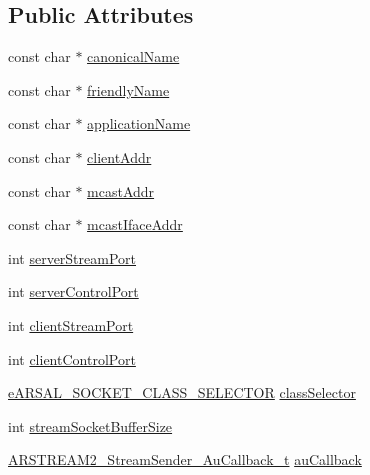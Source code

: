 \subsection*{Public Attributes}
\begin{DoxyCompactItemize}
\item 
const char $\ast$ \hyperlink{struct_a_r_s_t_r_e_a_m2___stream_sender___config__t_aa8bd89e7495f77d398dc65dd14c5d0fb}{canonical\+Name}
\item 
const char $\ast$ \hyperlink{struct_a_r_s_t_r_e_a_m2___stream_sender___config__t_af54158ca53377bfeee0cf26bdecea2a6}{friendly\+Name}
\item 
const char $\ast$ \hyperlink{struct_a_r_s_t_r_e_a_m2___stream_sender___config__t_a15da681a26d0f6ea932bf229898ac09f}{application\+Name}
\item 
const char $\ast$ \hyperlink{struct_a_r_s_t_r_e_a_m2___stream_sender___config__t_aed559fd35ae3729f0a183dea80ff820c}{client\+Addr}
\item 
const char $\ast$ \hyperlink{struct_a_r_s_t_r_e_a_m2___stream_sender___config__t_a0b083fe1ca17180653ff630ca6abb855}{mcast\+Addr}
\item 
const char $\ast$ \hyperlink{struct_a_r_s_t_r_e_a_m2___stream_sender___config__t_a2eb83e96566d124de30445c0d151f4d1}{mcast\+Iface\+Addr}
\item 
int \hyperlink{struct_a_r_s_t_r_e_a_m2___stream_sender___config__t_a33d9c51dd66d6f97de55684e27a23adc}{server\+Stream\+Port}
\item 
int \hyperlink{struct_a_r_s_t_r_e_a_m2___stream_sender___config__t_aa0792f0abdf2ea6b6fbf08d68d550a1e}{server\+Control\+Port}
\item 
int \hyperlink{struct_a_r_s_t_r_e_a_m2___stream_sender___config__t_a50fe4956833d82e763efe0fc8c44c344}{client\+Stream\+Port}
\item 
int \hyperlink{struct_a_r_s_t_r_e_a_m2___stream_sender___config__t_a804bf81f815b2d6d35abcda939afd4ab}{client\+Control\+Port}
\item 
\hyperlink{_a_r_s_a_l___socket_8h_a384a22e08e042073bccebf450786749b}{e\+A\+R\+S\+A\+L\+\_\+\+S\+O\+C\+K\+E\+T\+\_\+\+C\+L\+A\+S\+S\+\_\+\+S\+E\+L\+E\+C\+T\+OR} \hyperlink{struct_a_r_s_t_r_e_a_m2___stream_sender___config__t_a9420055cf4a97f65869ae9079c6cd918}{class\+Selector}
\item 
int \hyperlink{struct_a_r_s_t_r_e_a_m2___stream_sender___config__t_acba680e506f27b47148fe9d498efa88c}{stream\+Socket\+Buffer\+Size}
\item 
\hyperlink{arstream2__stream__sender_8h_a5d1862b0b8e1a4fa199887582cf04809}{A\+R\+S\+T\+R\+E\+A\+M2\+\_\+\+Stream\+Sender\+\_\+\+Au\+Callback\+\_\+t} \hyperlink{struct_a_r_s_t_r_e_a_m2___stream_sender___config__t_afba94f9eb88048ce3015718f828af7bb}{au\+Callback}

\end{DoxyCompactItemize}
